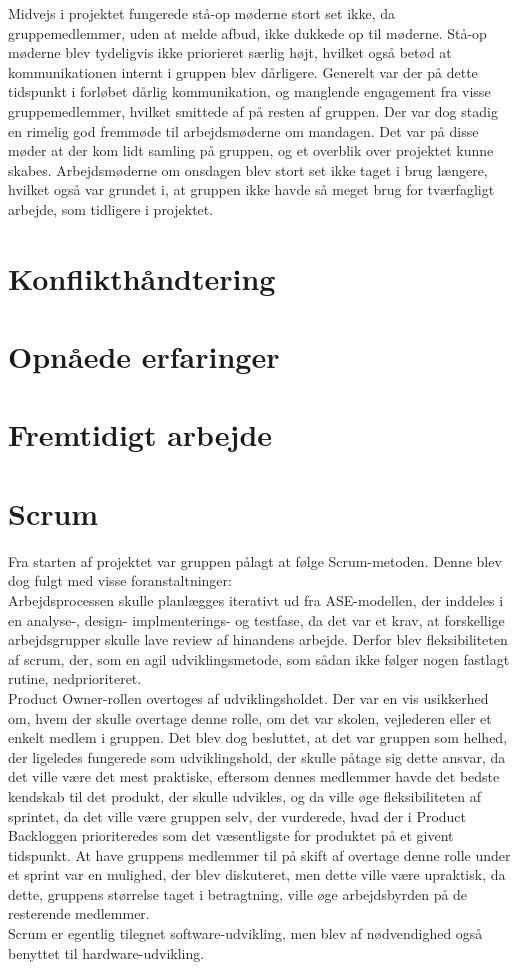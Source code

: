 Midvejs i projektet fungerede stå-op møderne stort set ikke, da gruppemedlemmer, uden at melde afbud, ikke dukkede op til møderne. Stå-op møderne
blev tydeligvis ikke priorieret særlig højt, hvilket også betød at kommunikationen internt i gruppen blev dårligere. Generelt var der på dette tidspunkt i forløbet
dårlig kommunikation, og manglende engagement fra visse gruppemedlemmer, hvilket smittede af på resten af gruppen.
Der var dog stadig en rimelig god fremmøde til arbejdsmøderne om mandagen. Det var på disse møder at der kom lidt samling på gruppen, og et overblik over projektet
kunne skabes. Arbejdsmøderne om onsdagen blev stort set ikke taget i brug længere, hvilket også var grundet i, at gruppen ikke havde så meget brug
for tværfagligt arbejde, som tidligere i projektet.

\section*{Konflikthåndtering}

\section*{Opnåede erfaringer}

\section*{Fremtidigt arbejde}

\section*{Scrum}
Fra starten af projektet var gruppen pålagt at følge Scrum-metoden. Denne blev dog fulgt med visse foranstaltninger:\\
Arbejdsprocessen skulle planlægges iterativt ud fra ASE-modellen, der inddeles i en analyse-, design- implmenterings- og testfase, da det var et krav, at forskellige
arbejdsgrupper skulle lave review af hinandens arbejde. Derfor blev fleksibiliteten af scrum, der, som en agil udviklingsmetode, som sådan ikke følger nogen
fastlagt rutine, nedprioriteret.\\
Product Owner-rollen overtoges af udviklingsholdet. Der var en vis usikkerhed om, hvem der skulle overtage denne rolle, om det var skolen, vejlederen eller et
enkelt medlem i gruppen. Det blev dog besluttet, at det var gruppen som helhed, der ligeledes fungerede som udviklingshold, der skulle påtage sig dette ansvar, da
det ville være det mest praktiske, eftersom dennes medlemmer havde det bedste kendskab til det produkt, der skulle udvikles, og da ville øge fleksibiliteten af
sprintet, da det ville være gruppen selv, der vurderede, hvad der i Product Backloggen prioriteredes som det væsentligste for produktet på et givent tidspunkt.
At have gruppens medlemmer til på skift af overtage denne rolle under et sprint var en mulighed, der blev diskuteret, men dette ville være upraktisk, da dette,
gruppens størrelse taget i betragtning, ville øge arbejdsbyrden på de resterende medlemmer.\\
Scrum er egentlig tilegnet software-udvikling, men blev af nødvendighed også benyttet til hardware-udvikling.\\

